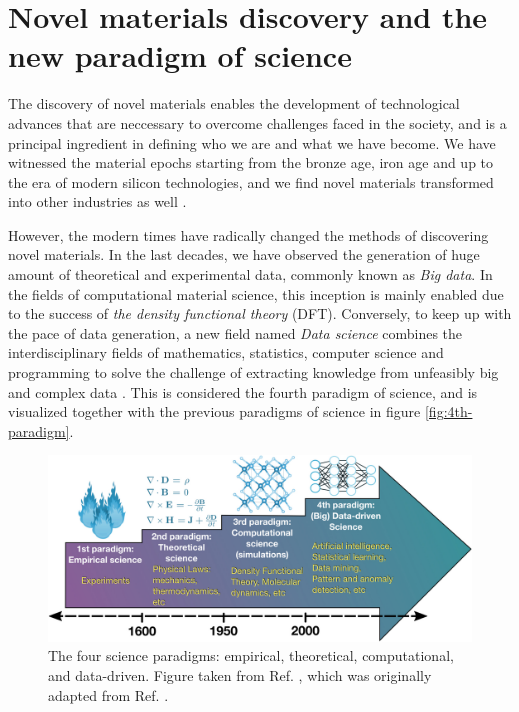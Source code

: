 \chapter{Novel materials discovery and the new paradigm of science}
%

The discovery of novel materials enables the development of technological advances that are neccessary to overcome challenges faced in the society, and is a principal ingredient in defining who we are and what we have become. We have witnessed the material epochs starting from the bronze age, iron age and up to the era of modern silicon technologies, and we find novel materials transformed into other industries as well \cite{Jain2016, Magee2012}.

However, the modern times have radically changed the methods of discovering novel materials. In the last decades, we have observed the generation of huge amount of theoretical and experimental data, commonly known as \textit{Big data}. In the fields of computational material science, this inception is mainly enabled due to the success of \textit{the density functional theory} (DFT). Conversely, to keep up with the pace of data generation, a new field named \textit{Data science} combines the interdisciplinary fields of mathematics, statistics, computer science and programming to solve the challenge of extracting knowledge from unfeasibly big and complex data \cite{Agrawal2016, Schleder2019}. This is considered the fourth paradigm of science, and is visualized together with the previous paradigms of science in figure \autoref{fig:4th-paradigm}.

\begin{figure}[ht!]
  \centering
  \includegraphics{theory/figures/4th-paradigm-hd.jpg}
  \caption{The four science paradigms: empirical, theoretical, computational, and data-driven. Figure taken from Ref.  \cite{Schleder2019}, which was originally adapted from Ref. \cite{Agrawal2016}.}
  \label{fig:4th-paradigm}
\end{figure}

